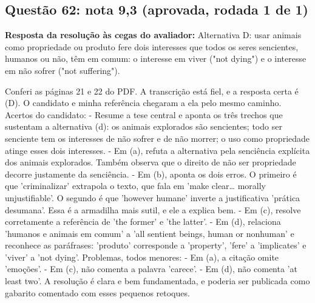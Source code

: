 \documentclass{article}%
\begin{document}
\subsection*{Questão 62: nota 9,3 (aprovada, rodada 1 de 1)}%
\textbf{Resposta da resolução às cegas do avaliador:} Alternativa D: usar animais como propriedade ou produto fere dois interesses que todos os seres sencientes, humanos ou não, têm em comum: o interesse em viver ("not dying") e o interesse em não sofrer ("not suffering").\par %
Conferi as páginas 21 e 22 do PDF. A transcrição está fiel, e a resposta certa é (D). O candidato e minha referência chegaram a ela pelo mesmo caminho.\newline%
\newline%
Acertos do candidato:\newline%
{-} Resume a tese central e aponta os três trechos que sustentam a alternativa (d): os animais explorados são sencientes; todo ser senciente tem os interesses de não sofrer e de não morrer; o uso como propriedade atinge esses dois interesses.\newline%
{-} Em (a), refuta a alternativa pela senciência explícita dos animais explorados. Também observa que o direito de não ser propriedade decorre justamente da senciência.\newline%
{-} Em (b), aponta os dois erros. O primeiro é que 'criminalizar' extrapola o texto, que fala em 'make clear\ldots{} morally unjustifiable'. O segundo é que 'however humane' inverte a justificativa 'prática desumana'. Essa é a armadilha mais sutil, e ele a explica bem.\newline%
{-} Em (c), resolve corretamente a referência de 'the former' e 'the latter'.\newline%
{-} Em (d), relaciona 'humanos e animais em comum' a 'all sentient beings, human or nonhuman' e reconhece as paráfrases: 'produto' corresponde a 'property', 'fere' a 'implicates' e 'viver' a 'not dying'.\newline%
\newline%
Problemas, todos menores:\newline%
{-} Em (a), a citação omite 'emoções'.\newline%
{-} Em (c), não comenta a palavra 'carece'.\newline%
{-} Em (d), não comenta 'at least two'.\newline%
\newline%
A resolução é clara e bem fundamentada, e poderia ser publicada como gabarito comentado com esses pequenos retoques.%
\end{document}
